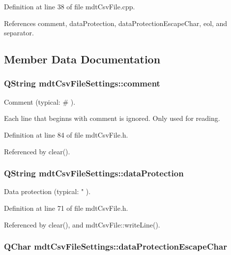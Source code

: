 Definition at line 38 of file mdt\-Csv\-File.\-cpp.



References comment, data\-Protection, data\-Protection\-Escape\-Char, eol, and separator.



\subsection{Member Data Documentation}
\hypertarget{structmdt_csv_file_settings_af9230b534ca8275a51a30a06f7c17fde}{
\subsubsection[{comment}]{\setlength{\rightskip}{0pt plus 5cm}Q\-String mdt\-Csv\-File\-Settings\-::comment}}\label{structmdt_csv_file_settings_af9230b534ca8275a51a30a06f7c17fde}


Comment (typical\-: \# ). 

Each line that beginns with comment is ignored. Only used for reading. 

Definition at line 84 of file mdt\-Csv\-File.\-h.



Referenced by clear().

\hypertarget{structmdt_csv_file_settings_af966d17d76133bdc26500f95e48898db}{
\subsubsection[{data\-Protection}]{\setlength{\rightskip}{0pt plus 5cm}Q\-String mdt\-Csv\-File\-Settings\-::data\-Protection}}\label{structmdt_csv_file_settings_af966d17d76133bdc26500f95e48898db}


Data protection (typical\-: " ). 



Definition at line 71 of file mdt\-Csv\-File.\-h.



Referenced by clear(), and mdt\-Csv\-File\-::write\-Line().

\hypertarget{structmdt_csv_file_settings_a8465fa39570d48091a38a1efc8e0c3a2}{
\subsubsection[{data\-Protection\-Escape\-Char}]{\setlength{\rightskip}{0pt plus 5cm}Q\-Char mdt\-Csv\-File\-Settings\-::data\-Protection\-Escape\-Char}}\label{structmdt_csv_file_settings_a8465fa39570d48091a38a1efc8e0c3a2}


